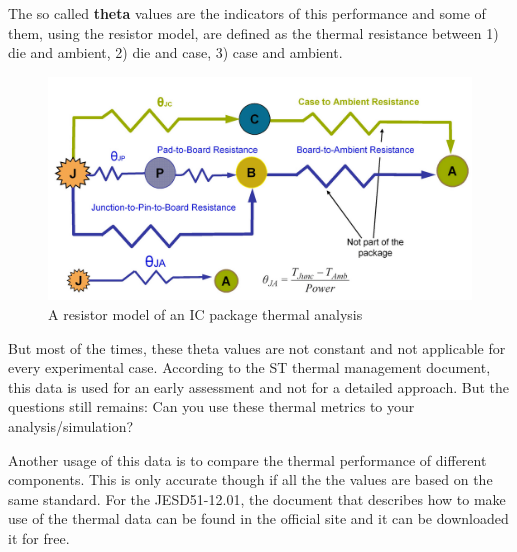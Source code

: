 \documentclass[final]{cubedoc}
\begin{document}
	The so called \textbf{theta} values are the indicators of this performance and some of them, using the resistor model, are defined as the thermal resistance between 1) die and ambient, 2) die and case, 3) case and ambient.
	
	\begin{figure}[h!]
		\centering
		\includegraphics[width=\textwidth]{docs/resistor_model.png}
		\caption{A resistor model of an IC package thermal analysis} 
		\label{fig:my_label}
	\end{figure}
	
	But most of the times, these theta values are not constant and not applicable for every experimental case. According to the ST thermal management document, this data is used for an early assessment and not for a detailed approach. But the questions still remains: Can you use these thermal metrics to your analysis/simulation?
	
	Another usage of this data is to compare the thermal performance of different components. This is only accurate though if all the the values are based on the same standard. For the JESD51-12.01, the document that describes how to make use of the thermal data can be found in the official site and it can be downloaded it for free.
	
	
\end{document}
